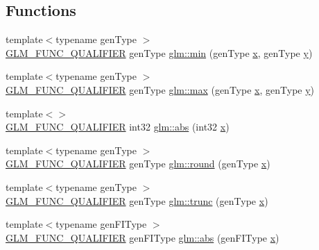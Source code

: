 \subsection*{Functions}
\begin{DoxyCompactItemize}
\item 
{\footnotesize template$<$typename gen\+Type $>$ }\\\hyperlink{setup_8hpp_a33fdea6f91c5f834105f7415e2a64407}{G\+L\+M\+\_\+\+F\+U\+N\+C\+\_\+\+Q\+U\+A\+L\+I\+F\+I\+ER} gen\+Type \hyperlink{group__core__func__common_ga2c2bde1cec025b7ddff83c74a1113719}{glm\+::min} (gen\+Type \hyperlink{_s_d_l__opengl_8h_ad0e63d0edcdbd3d79554076bf309fd47}{x}, gen\+Type \hyperlink{_s_d_l__opengl_8h_a1675d9d7bb68e1657ff028643b4037e3}{y})
\item 
{\footnotesize template$<$typename gen\+Type $>$ }\\\hyperlink{setup_8hpp_a33fdea6f91c5f834105f7415e2a64407}{G\+L\+M\+\_\+\+F\+U\+N\+C\+\_\+\+Q\+U\+A\+L\+I\+F\+I\+ER} gen\+Type \hyperlink{group__core__func__common_ga98caa7f95a94c86a86ebce893a45326c}{glm\+::max} (gen\+Type \hyperlink{_s_d_l__opengl_8h_ad0e63d0edcdbd3d79554076bf309fd47}{x}, gen\+Type \hyperlink{_s_d_l__opengl_8h_a1675d9d7bb68e1657ff028643b4037e3}{y})
\item 
{\footnotesize template$<$$>$ }\\\hyperlink{setup_8hpp_a33fdea6f91c5f834105f7415e2a64407}{G\+L\+M\+\_\+\+F\+U\+N\+C\+\_\+\+Q\+U\+A\+L\+I\+F\+I\+ER} int32 \hyperlink{namespaceglm_a297722642f818493a6e4b02f4cf7781b}{glm\+::abs} (int32 \hyperlink{_s_d_l__opengl_8h_ad0e63d0edcdbd3d79554076bf309fd47}{x})
\item 
{\footnotesize template$<$typename gen\+Type $>$ }\\\hyperlink{setup_8hpp_a33fdea6f91c5f834105f7415e2a64407}{G\+L\+M\+\_\+\+F\+U\+N\+C\+\_\+\+Q\+U\+A\+L\+I\+F\+I\+ER} gen\+Type \hyperlink{namespaceglm_a63066719f14195375ae55b9770460301}{glm\+::round} (gen\+Type \hyperlink{_s_d_l__opengl_8h_ad0e63d0edcdbd3d79554076bf309fd47}{x})
\item 
{\footnotesize template$<$typename gen\+Type $>$ }\\\hyperlink{setup_8hpp_a33fdea6f91c5f834105f7415e2a64407}{G\+L\+M\+\_\+\+F\+U\+N\+C\+\_\+\+Q\+U\+A\+L\+I\+F\+I\+ER} gen\+Type \hyperlink{namespaceglm_a1bd4a73a4a1f73950597df2f67c01c43}{glm\+::trunc} (gen\+Type \hyperlink{_s_d_l__opengl_8h_ad0e63d0edcdbd3d79554076bf309fd47}{x})
\item 
{\footnotesize template$<$typename gen\+F\+I\+Type $>$ }\\\hyperlink{setup_8hpp_a33fdea6f91c5f834105f7415e2a64407}{G\+L\+M\+\_\+\+F\+U\+N\+C\+\_\+\+Q\+U\+A\+L\+I\+F\+I\+ER} gen\+F\+I\+Type \hyperlink{namespaceglm_a20ebe8867152652a4830a35894b5ab33}{glm\+::abs} (gen\+F\+I\+Type \hyperlink{_s_d_l__opengl_8h_ad0e63d0edcdbd3d79554076bf309fd47}{x})

\end{DoxyCompactItemize}
